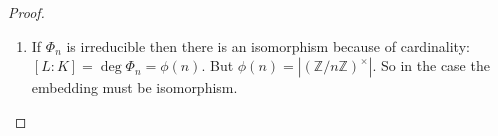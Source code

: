 \begin{theorem}
\begin{proof}
\begin{enumerate}
{          Comments from staff about the identity preserving: The proof
          of injectivity in the lecture goes as follows: take
          arbitrary element $g \in Gal(L/K)$. We prove, that if the
          image of $g$ is the identity in $(\mathbb{Z}/n)*$,
          then $g$ is itself the identity in $Gal(L/K)$.
          \label{note:lec6_staff_comment}
        }
       \item If $\Phi_n$ is irreducible then there is an isomorphism
         because of cardinality: $\left[L:K\right] = \deg \Phi_n =
         \phi\left(n\right)$. But
         $\phi\left(n\right) =
         \left|\left(\mathbb{Z}/n\mathbb{Z}\right)^\times\right|$. So in
         the case the embedding must be isomorphism. 
    \end{enumerate}    
  \end{proof}
  \label{thm:lec6_3}
\end{theorem}
